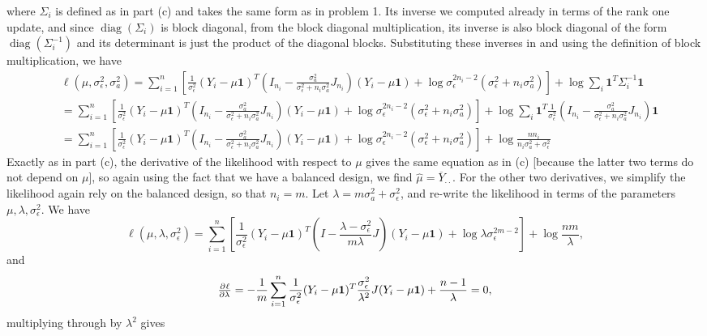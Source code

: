 \documentclass[11pt]{article}
\newcommand{\diag}{\operatorname{diag}}
\begin{document}
\begin{enumerate}
\begin{enumerate}
			where $\Sigma_i$ is defined as in part (c) and takes the same form as in problem 1. Its inverse we computed already in terms of the rank one update, and since $\diag(\Sigma_i)$ is block diagonal, from the block diagonal multiplication, its inverse is also block diagonal of the form $\diag(\Sigma_i^{-1})$ and its determinant is just the product of the diagonal blocks. Substituting these inverses in and using the definition of block multiplication, we have
			\begin{align*}
				&\ell(\mu,\sigma_\epsilon^2,\sigma_a^2) = \sum_{i=1}^n[\frac{1}{\sigma_\epsilon^2}(Y_i-\mu\bm{1})^T(I_{n_i} - \frac{\sigma_a^2}{\sigma_\epsilon^2 + n_i\sigma_a^2} J_{n_i})(Y_i-\mu\bm{1}) + \log \sigma_\epsilon^{2n_i-2}(\sigma_\epsilon^2 + n_i\sigma_a^2)] + \log \sum_i\bm{1}^T\Sigma_i^{-1}\bm{1} \\
				&=\sum_{i=1}^n[\frac{1}{\sigma_\epsilon^2}(Y_i-\mu\bm{1})^T(I_{n_i} - \frac{\sigma_a^2}{\sigma_\epsilon^2 + n_i\sigma_a^2} J_{n_i})(Y_i-\mu\bm{1}) + \log \sigma_\epsilon^{2n_i-2}(\sigma_\epsilon^2 + n_i\sigma_a^2)] + \log\sum_i\bm{1}^T\frac{1}{\sigma_\epsilon^2}(I_{n_i} - \frac{\sigma_a^2}{\sigma_\epsilon^2 + n_i\sigma_a^2} J_{n_i})\bm{1} \\
				&= \sum_{i=1}^n[\frac{1}{\sigma_\epsilon^2}(Y_i-\mu\bm{1})^T(I_{n_i} - \frac{\sigma_a^2}{\sigma_\epsilon^2 + n_i\sigma_a^2} J_{n_i})(Y_i-\mu\bm{1}) + \log \sigma_\epsilon^{2n_i-2}(\sigma_\epsilon^2 + n_i\sigma_a^2)] + \log \frac{nn_i}{n_i\sigma_a^2 + \sigma_\epsilon^2}
			\end{align*}
			Exactly as in part (c), the derivative of the likelihood with respect to $\mu$ gives the same equation as in (c) [because the latter two terms do not depend on $\mu$], so again using the fact that we have a balanced design, we find $\widehat{\mu} = \overline{Y}_{\cdot\cdot}$. For the other two derivatives, we simplify the likelihood again rely on the balanced design, so that $n_i = m$. Let $\lambda = m\sigma_a^2 + \sigma_\epsilon^2$, and re-write the likelihood in terms of the parameters $\mu, \lambda, \sigma_\epsilon^2$. We have
			\[
				\ell(\mu, \lambda, \sigma_\epsilon^2) = \sum_{i=1}^n[\frac{1}{\sigma_\epsilon^2}(Y_i-\mu\bm{1})^T(I - \frac{\lambda-\sigma_\epsilon^2}{m\lambda} J)(Y_i-\mu\bm{1}) + \log \lambda\sigma_\epsilon^{2m-2}] + \log \frac{nm}{\lambda},
			\]
			and
			\[
				\pd{\ell}{\lambda} = -\frac{1}{m}\sum_{i=1}^n\frac{1}{\sigma_\epsilon^2}(Y_i-\mu\bm{1})^T\frac{\sigma_\epsilon^2}{\lambda^2}J(Y_i-\mu\bm{1}) + \frac{n-1}{\lambda} = 0,
			\]
			multiplying through by $\lambda^2$ gives
			\begin{align*}

\end{align*}
\end{enumerate}
\end{enumerate}
\end{document}
